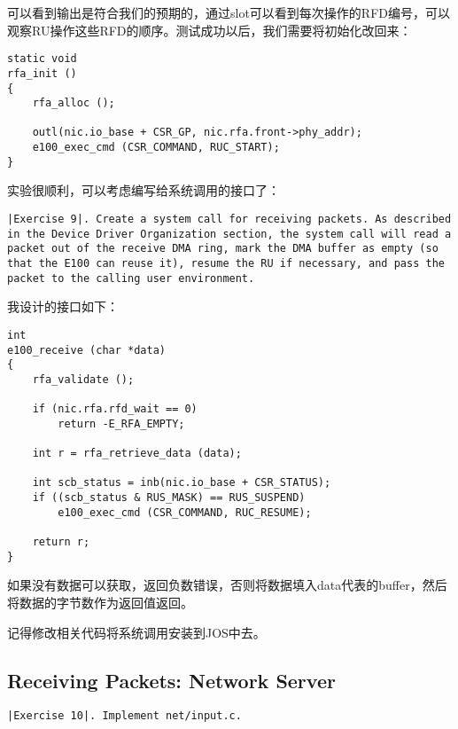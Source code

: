 \documentclass{article}
\begin{document}
\begin{CJK*}{UTF8}{gkai}
可以看到输出是符合我们的预期的，通过slot可以看到每次操作的RFD编号，可以观察RU操作这些RFD的顺序。测试成功以后，我们需要将初始化改回来：

\begin{lstlisting}[style=ccode, title={\scriptsize \ttfamily \bfseries kern/e100.c: rfa\_init()}]
static void
rfa_init () 
{
    rfa_alloc ();

    outl(nic.io_base + CSR_GP, nic.rfa.front->phy_addr);
    e100_exec_cmd (CSR_COMMAND, RUC_START); 
}
\end{lstlisting}

实验很顺利，可以考虑编写给系统调用的接口了：
\newpage

\begin{lstlisting}[style=exercise]
|Exercise 9|. Create a system call for receiving packets. As described in the Device Driver Organization section, the system call will read a packet out of the receive DMA ring, mark the DMA buffer as empty (so that the E100 can reuse it), resume the RU if necessary, and pass the packet to the calling user environment.
\end{lstlisting}

我设计的接口如下：



\begin{lstlisting}[style=ccode, title={\scriptsize \ttfamily \bfseries kern/e100.c: e100\_receive()}]
int 
e100_receive (char *data)
{
    rfa_validate ();

    if (nic.rfa.rfd_wait == 0)
        return -E_RFA_EMPTY;

    int r = rfa_retrieve_data (data);
    
    int scb_status = inb(nic.io_base + CSR_STATUS);
    if ((scb_status & RUS_MASK) == RUS_SUSPEND)
        e100_exec_cmd (CSR_COMMAND, RUC_RESUME); 

    return r;
}
\end{lstlisting}

如果没有数据可以获取，返回负数错误，否则将数据填入data代表的buffer，然后将数据的字节数作为返回值返回。

记得修改相关代码将系统调用安装到JOS中去。


\subsection{Receiving Packets: Network Server}



\begin{lstlisting}[style=exercise]
|Exercise 10|. Implement net/input.c.
\end{lstlisting}


\end{CJK*}
\end{document}
